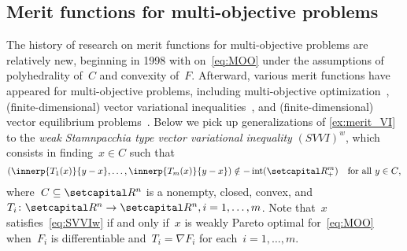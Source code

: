 \documentclass[../../main]{subfiles}
\begin{document}
\subsection{Merit functions for multi-objective problems} \label{sec:intro:merit:MO}
The history of research on merit functions for multi-objective problems are relatively new, beginning in 1998 with \textcite{Chen1998} on~\cref{eq:MOO} under the assumptions of polyhedrality of~$C$ and convexity of~$F$.
Afterward, various merit functions have appeared for multi-objective problems, including multi-objective optimization~\cite{Liu2009,Dutta2017}, (finite-dimensional) vector variational inequalities~\cite{Chen2000,Konnov2005,Li2005,Yang2002,Yang2003,Charitha2010,Li2010}, and (finite-dimensional) vector equilibrium problems~\cite{Huang2007,Li2005,Li2007,Li2006,Mastroeni2003}.
Below we pick up generalizations of \cref{ex:merit_VI} to the \emph{weak Stamnpacchia type vector variational inequality} $(SVVI)^w$, which consists in finding~$x \in C$ such that
\[ \label{eq:SVVIw}
    (\innerp{T_1(x)}{y - x}, \dots, \innerp{T_m(x)}{y - x}) \notin - \interior(\setRpos^m) \forallcondition{y \in C}
,\] 
where~$C \subseteq \setR^n$ is a nonempty, closed, convex, and $T_i \colon \setR^n \to \setR^n, i = 1, \dots, m$.
Note that~$x$ satisfies~\cref{eq:SVVIw} if and only if~$x$ is weakly Pareto optimal for~\cref{eq:MOO} when~$F_i$ is differentiable and~$T_i = \nabla F_i$ for each~$i = 1, \dots, m$.
\end{document}
